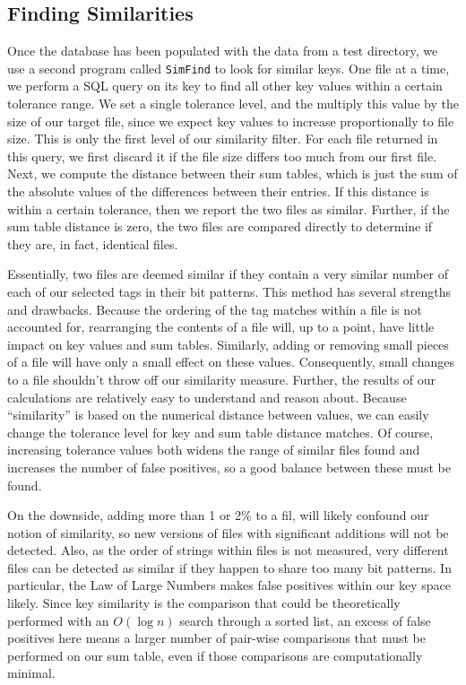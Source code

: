 \documentclass[10pt, twocolumn]{article}
\begin{document}
\subsection{Finding Similarities}

Once the database has been populated with the data from a test directory, we use a second program called {\tt SimFind} to look for similar keys.  One file at a time, we perform a SQL query on its key to find all other key values within a certain tolerance range.  We set a single tolerance level, and the multiply this value by the size of our target file, since we expect key values to increase proportionally to file size.  This is only the first level of our similarity filter.  For each file returned in this query, we first discard it if the file size differs too much from our first file.  Next, we compute the distance between their sum tables, which is just the sum of the absolute values of the differences between their entries.  If this distance is within a certain tolerance, then we report the two files as similar.  Further, if the sum table distance is zero, the two files are compared directly to determine if they are, in fact, identical files.

Essentially, two files are deemed similar if they contain a very similar number of each of our selected tags in their bit patterns.  This method has several strengths and drawbacks.  Because the ordering of the tag matches within a file is not accounted for, rearranging the contents of a file will, up to a point, have little impact on key values and sum tables.  Similarly, adding or removing small pieces of a file will have only a small effect on these values.  Consequently, small changes to a file shouldn't throw off our similarity measure.  Further, the results of our calculations are relatively easy to understand and reason about.  Because ``similarity'' is based on the numerical distance between values, we can easily change the tolerance level for key and sum table distance matches.  Of course, increasing tolerance values both widens the range of similar files found and increases the number of false positives, so a good balance between these must be found.

On the downside, adding more than 1 or 2\% to a fil, will likely confound our notion of similarity, so new versions of files with significant additions will not be detected.  Also, as the order of strings within files is not measured, very different files can be detected as similar if they happen to share too many bit patterns.  In particular, the Law of Large Numbers makes false positives within our key space likely.  Since key similarity is the comparison that could be theoretically performed with an $O(\log n)$ search through a sorted list, an excess of false positives here means a larger number of pair-wise comparisons that must be performed on our sum table, even if those comparisons are computationally minimal.
\end{document}

